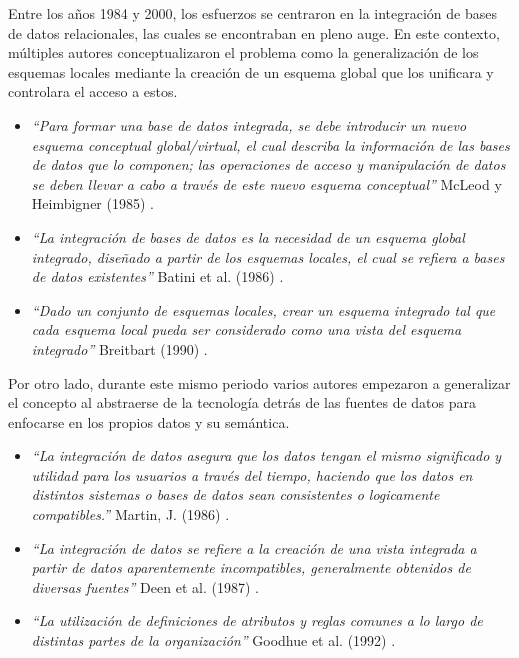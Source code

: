     Entre los años 1984 y 2000, los esfuerzos se centraron en la integración de bases de datos relacionales, las cuales
    se encontraban en pleno auge.  
    En este contexto, múltiples autores conceptualizaron el problema como
    la generalización de los esquemas locales mediante la creación de un esquema global que los unificara y controlara el acceso a estos.
        \begin{itemize}
            \item 
            \textit{``Para formar una base de datos integrada, se debe introducir un nuevo esquema conceptual global/virtual,
            el cual describa la información de las bases de datos que lo componen; las operaciones de acceso y manipulación
            de datos se deben llevar a cabo a través de este nuevo esquema conceptual''} McLeod y Heimbigner (1985) \cite{McLeod1985}.

            \item 
           \textit{``La integración de bases de datos es la necesidad de un esquema global integrado, diseñado a partir de los esquemas locales, el cual se refiera a bases de datos existentes''} Batini et al. (1986) \cite{Batini1986}.

            \item \textit{``Dado un conjunto de esquemas locales, crear un esquema integrado tal que cada esquema local pueda ser considerado como una vista
            del esquema integrado''} Breitbart (1990) \cite{breitbart1990multidatabase}.
           
        \end{itemize}

Por otro lado, durante este mismo periodo varios autores empezaron a generalizar el concepto
al abstraerse de la tecnología detrás de las fuentes de datos para enfocarse en los propios datos y su
semántica.
\begin{itemize}
    \item \textit{``La integración de datos asegura que los datos tengan el mismo significado y utilidad para los usuarios a través del tiempo, haciendo que los datos en distintos sistemas o bases de datos sean consistentes o logicamente compatibles.''} Martin, J. (1986) \cite{martin1986information}.
    
    \item \textit{``La integración de datos se refiere a la creación de una vista integrada a partir de datos aparentemente
    incompatibles, generalmente obtenidos de diversas fuentes''} Deen et al. (1987) \cite{deen1987data}.
   
    \item \textit{``La utilización de definiciones de atributos y reglas comunes a lo largo de distintas partes
    de la organización''} Goodhue et al. (1992) \cite{goodhue1992impact}.
\end{itemize}


